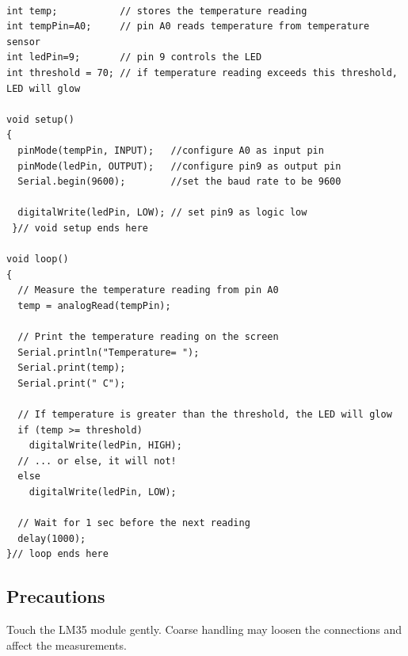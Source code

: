 \begin{lstlisting}[language=Arduino, numbers=none, caption={Arduino code for measuring the temperature of hands},captionpos=b, label={lst:temp}]

int temp;           // stores the temperature reading 
int tempPin=A0;     // pin A0 reads temperature from temperature sensor
int ledPin=9;       // pin 9 controls the LED
int threshold = 70; // if temperature reading exceeds this threshold, LED will glow

void setup() 
{
  pinMode(tempPin, INPUT);   //configure A0 as input pin
  pinMode(ledPin, OUTPUT);   //configure pin9 as output pin
  Serial.begin(9600);        //set the baud rate to be 9600
  
  digitalWrite(ledPin, LOW); // set pin9 as logic low
 }// void setup ends here

void loop() 
{
  // Measure the temperature reading from pin A0
  temp = analogRead(tempPin);
  
  // Print the temperature reading on the screen
  Serial.println("Temperature= ");
  Serial.print(temp);
  Serial.print(" C");

  // If temperature is greater than the threshold, the LED will glow
  if (temp >= threshold)
    digitalWrite(ledPin, HIGH);
  // ... or else, it will not!
  else
    digitalWrite(ledPin, LOW);
  
  // Wait for 1 sec before the next reading
  delay(1000);
}// loop ends here

\end{lstlisting}

\subsection*{Precautions}
Touch the LM35 module gently. Coarse handling may loosen the connections and affect the measurements.